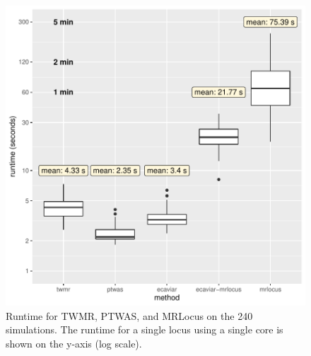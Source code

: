 \documentclass[11pt]{article}
\newcommand{\Ncase}{$N_{\textrm{case}}$\xspace}
\newcommand{\Ncontrol}{$N_{\textrm{control}}$\xspace}
\begin{document}
\begin{figure}[!ht]
  \centering
  \includegraphics[width=.7\textwidth]{figs/runtime}
  \caption{Runtime for TWMR, PTWAS, and MRLocus on the 240
    simulations. The runtime for a single locus using a single core is
    shown on the y-axis (log scale).}
\end{figure}


\end{document}
